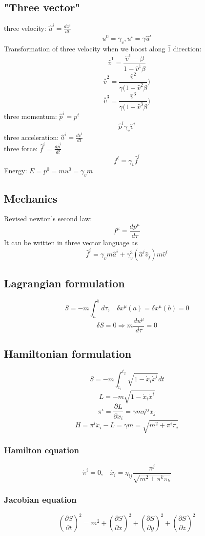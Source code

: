 \documentclass{article}
\begin{document}
\subsection{"Three vector"}
three velocity: $\hat{u}^{i} = \frac{dx^i}{dt}$
\[u^0 = \gamma_v, u^i = \gamma \hat{u}^i\]
Transformation of three velocity when we boost along $\hat{1}$ direction:
\[\bar{\hat{v}}^1 = \frac{\hat{v}^1 - \beta}{1-\hat{v}^1 \beta}\]
\[\bar{\hat{v}}^2 = \frac{\hat{v}^2}{\gamma(1-\hat{v}^2 \beta})\]
\[\bar{\hat{v}}^3 = \frac{\hat{v}^3}{\gamma(1-\hat{v}^3 \beta})\]
three momentum: $\hat{p}^{i} = p^i$
\[\hat{p}^{i} \gamma_v \hat{v}^i\]
three acceleration: $\hat{a}^{i} = \frac{dv^i}{dt}$\\
three force: $\hat{f}^i = \frac{d\hat{p}^i}{dt}$
\[f^i = \gamma_v \hat{f}^i\]
Energy: $E = p^0 = m u^0 = \gamma_v m$


\subsection{Mechanics}
Revised newton's second law:
\[f^{\mu} = \frac{dp^{\mu}}{d\tau}\]
It can be written in three vector language as
\[\hat{f}^i = \gamma_v m \hat{a}^i + \gamma_v^3 (\hat{a}^j \hat{v}_j) m \hat{v}^i\]

\subsection{Lagrangian formulation}
\[S=-m\int_{a}^{b} d\tau, \ \ \ \ \delta x^{\mu}(a) = \delta x^{\mu}(b) = 0\]
\[\delta S = 0 \Rightarrow m\frac{du^{\mu}}{d\tau} = 0\]

\subsection{Hamiltonian formulation}
\[S = -m \int_{t_1}^{t_2} \sqrt{1-\dot{x}_i\dot{x}^i} dt\]
\[L = - m \sqrt{1-\dot{x}_i\dot{x}^i}\]
\[\pi^i = \frac{\partial L}{\partial \dot{x}_i} = \gamma m \eta^{ij}\dot{x}_j\]
\[H = \pi^i \dot{x}_i - L = \gamma m = \sqrt{m^2 + \pi^i \pi_i}\]
\subsubsection{Hamilton equation}
\[\dot{\pi}^i = 0, \ \ \ \ \dot{x_i} = \eta_{ij}\frac{\pi^j}{\sqrt{m^2 + \pi^k \pi_k}}\]

\subsubsection{Jacobian equation}
\[(\frac{\partial S}{\partial t})^2 = m^2 + (\frac{\partial S}{\partial x})^2 + (\frac{\partial S}{\partial y})^2 + (\frac{\partial S}{\partial z})^2\]
\end{document}
